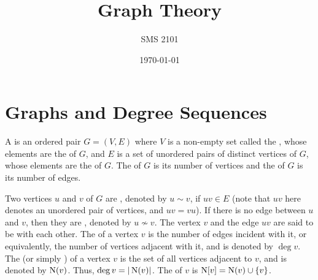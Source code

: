
\title{\textbf{Graph Theory}}
\author{\textsc{SMS 2101}}

\date{\today}
\maketitle

\begingroup
\let\clearpage\relax
\tableofcontents
\endgroup

\clearpage

\renewcommand{\nomname}{List of Symbols}

\printnomenclature[10em]

\clearpage

\section{Graphs and Degree Sequences}\label{sec:GraphsDegreeSequences}
A  is an ordered pair $G = (V, E)$ where $V$ is a non-empty set called the , whose elements are the  of $G$, and $E$ is a set of unordered pairs of distinct vertices of $G$, whose elements are the  of $G$. The  of $G$ is its number of vertices and the  of $G$ is its number of edges.

Two vertices $u$ and $v$ of $G$ are , denoted by $u \sim v$, if $uv \in E$ (note that $uv$ here denotes an unordered pair of vertices, and $uv = vu$). If there is no edge between $u$ and $v$, then they are , denoted by $u \nsim v$. The vertex $v$ and the edge $uv$ are said to be  with each other. The  of a vertex $v$ is the number of edges incident with it, or equivalently, the number of vertices adjacent with it, and is denoted by $\deg v$. The  (or simply ) of a vertex $v$ is the set of all vertices adjacent to $v$, and is denoted by $\operatorname{N}(v)$. Thus, $\deg v = |\operatorname{N}(v)|$. The  of $v$ is $\operatorname{N}[v] = \operatorname{N}(v) \cup \{v\}$.

